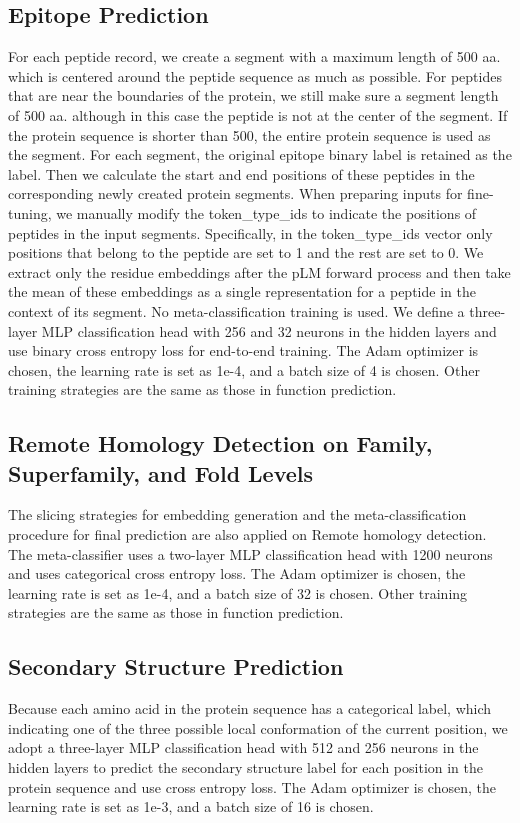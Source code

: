 \documentclass{article}
\begin{document}
\subsection*{Epitope Prediction}
For each peptide record, we create a segment with a maximum length of 500 aa. which is centered around the peptide sequence as much as possible. For peptides that are near the boundaries of the protein, we still make sure a segment length of 500 aa. although in this case the peptide is not at the center of the segment. If the protein sequence is shorter than 500, the entire protein sequence is used as the segment. For each segment, the original epitope binary label is retained as the label. Then we calculate the start and end positions of these peptides in the corresponding newly created protein segments. When preparing inputs for fine-tuning, we manually modify the token\_type\_ids to indicate the positions of peptides in the input segments. Specifically, in the token\_type\_ids vector only positions that belong to the peptide are set to 1 and the rest are set to 0. We extract only the residue embeddings after the pLM forward process and then take the mean of these embeddings as a single representation for a peptide in the context of its segment. No meta-classification training is used. We define a three-layer MLP classification head with 256 and 32 neurons in the hidden layers and use binary cross entropy loss for end-to-end training. The Adam optimizer is chosen, the learning rate is set as 1e-4, and a batch size of 4 is chosen. Other training strategies are the same as those in function prediction.

\subsection*{Remote Homology Detection on Family, Superfamily, and Fold Levels}
The slicing strategies for embedding generation and the meta-classification procedure for final prediction are also applied on Remote homology detection. The meta-classifier uses a two-layer MLP classification head with 1200 neurons and uses categorical cross entropy loss. The Adam optimizer is chosen, the learning rate is set as 1e-4, and a batch size of 32 is chosen. Other training strategies are the same as those in function prediction.

\subsection*{Secondary Structure Prediction}
Because each amino acid in the protein sequence has a categorical label, which indicating one of the three possible local conformation of the current position, we adopt a three-layer MLP classification head with 512 and 256 neurons in the hidden layers to predict the secondary structure label for each position in the protein sequence and use cross entropy loss. The Adam optimizer is chosen, the learning rate is set as 1e-3, and a batch size of 16 is chosen.
\end{document}
